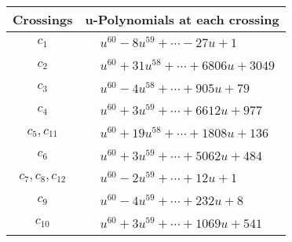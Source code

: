 \documentclass[1p]{elsarticle_modified}
\theoremstyle{definition}
\begin{document}
\begin{tabular}{m{50pt}|m{274pt}}
Crossings & \hspace{64pt}u-Polynomials at each crossing \\
\hline $$\begin{aligned}c_{1}\end{aligned}$$&$\begin{aligned}
&u^{60}-8 u^{59}+\cdots-27 u+1
\end{aligned}$\\
\hline $$\begin{aligned}c_{2}\end{aligned}$$&$\begin{aligned}
&u^{60}+31 u^{58}+\cdots+6806 u+3049
\end{aligned}$\\
\hline $$\begin{aligned}c_{3}\end{aligned}$$&$\begin{aligned}
&u^{60}-4 u^{58}+\cdots+905 u+79
\end{aligned}$\\
\hline $$\begin{aligned}c_{4}\end{aligned}$$&$\begin{aligned}
&u^{60}+3 u^{59}+\cdots+6612 u+977
\end{aligned}$\\
\hline $$\begin{aligned}c_{5},c_{11}\end{aligned}$$&$\begin{aligned}
&u^{60}+19 u^{58}+\cdots+1808 u+136
\end{aligned}$\\
\hline $$\begin{aligned}c_{6}\end{aligned}$$&$\begin{aligned}
&u^{60}+3 u^{59}+\cdots+5062 u+484
\end{aligned}$\\
\hline $$\begin{aligned}c_{7},c_{8},c_{12}\end{aligned}$$&$\begin{aligned}
&u^{60}-2 u^{59}+\cdots+12 u+1
\end{aligned}$\\
\hline $$\begin{aligned}c_{9}\end{aligned}$$&$\begin{aligned}
&u^{60}-4 u^{59}+\cdots+232 u+8
\end{aligned}$\\
\hline $$\begin{aligned}c_{10}\end{aligned}$$&$\begin{aligned}
&u^{60}+3 u^{59}+\cdots+1069 u+541
\end{aligned}$\\
\hline
\end{tabular}\\~\\
\end{document}

